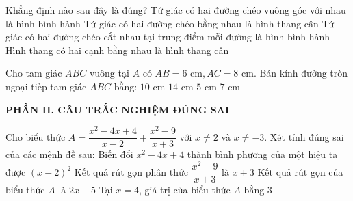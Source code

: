 \documentclass[12pt,a4paper]{article}
\begin{document}
\begin{ex}
Khẳng định nào sau đây là đúng?
\choice
{Tứ giác có hai đường chéo vuông góc với nhau là hình bình hành}
{Tứ giác có hai đường chéo bằng nhau là hình thang cân}
{\True Tứ giác có hai đường chéo cắt nhau tại trung điểm mỗi đường là hình bình hành}
{Hình thang có hai cạnh bằng nhau là hình thang cân}
\end{ex}

\begin{ex}
Cho tam giác $ABC$ vuông tại $A$ có $AB = 6\text{ cm}, AC = 8\text{ cm}$. Bán kính đường tròn ngoại tiếp tam giác $ABC$ bằng:
\choice
{$10\text{ cm}$}
{$14\text{ cm}$}
{\True $5\text{ cm}$}
{$7\text{ cm}$}
\end{ex}


\setcounter{ex}{0}
\noindent\textbf{\large PHẦN II. CÂU TRẮC NGHIỆM ĐÚNG SAI}
\vspace{1mm}
\begin{ex}
Cho biểu thức $A = \dfrac{x^2 - 4x + 4}{x - 2} + \dfrac{x^2 - 9}{x + 3}$ với $x \neq 2$ và $x \neq -3$. Xét tính đúng sai của các mệnh đề sau:
\choiceTF
{\True Biến đổi $x^2 - 4x + 4$ thành bình phương của một hiệu ta được $(x - 2)^2$}
{Kết quả rút gọn phân thức $\dfrac{x^2 - 9}{x + 3}$ là $x + 3$}
{\True Kết quả rút gọn của biểu thức $A$ là $2x - 5$}
{\True Tại $x = 4$, giá trị của biểu thức $A$ bằng $3$}
\end{ex}
\end{document}
